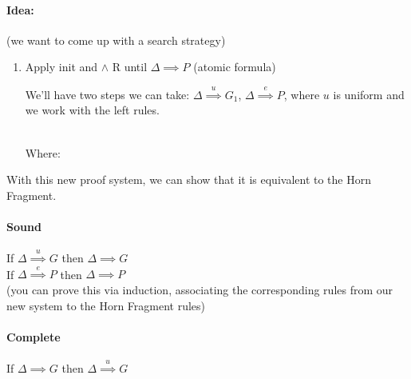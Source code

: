 \documentclass[12 pt]{article}
\begin{document}
	\paragraph{Idea:} (we want to come up with a search strategy)
	\begin{enumerate}
		\item Apply init and $\land$ R until $\Delta \implies P$
		      (atomic formula)

		      We'll have two steps we can take: $\Delta
			      \stackrel{u}{\implies}G_1$, $\Delta \stackrel{e}{\implies}P$,
		      where $u$ is uniform and we work with the left rules.

		      \begin{center}
			      \DP
			      \DP
			      \\ Where:
			      \DP
			      \DP
			      \DP
		      \end{center}
	\end{enumerate}
	With this new proof system, we can show that it is equivalent
	to the Horn Fragment.
	\paragraph{Sound} If $\Delta \stackrel{u}{\implies}G$ then
$\Delta \implies G$
	\\ If $\Delta \stackrel{e}{\implies} P$ then $\Delta \implies
P$
	\\ (you can prove this via induction, associating the
	corresponding rules from our new system to the Horn Fragment
	rules)
	\paragraph{Complete} If $\Delta \implies G$ then $\Delta
\stackrel{u}{\implies} G$
\end{document}
